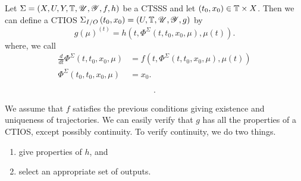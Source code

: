 
Let $\Sigma = \left( X, U, Y, \mathbb{T}, \mathscr{U}, \mathscr{Y}, f, h \right) $ be a CTSSS and let $\left( t_0, x_0 \right) \in \mathbb{T} \times X$. Then we can define a CTIOS $\Sigma _{I / O}\left( t_0, x_0 \right)  =\left( U, \mathbb{T} , \mathscr{U}, \mathscr{Y}, g\right)  $ by 
\[
	g\left( \mu \right) ^{\left( t \right) } = h\left( t, \Phi^{\Sigma}\left( t, t_0, x_0, \mu \right) , \mu\left( t \right)  \right) 
.\] 
where, we call 
\tdomain\begin{align*}
	\frac{d}{dt}\Phi^{\Sigma}\left( t, t_0, x_0, \mu \right) &= f\left( t, \Phi^{\Sigma}\left( t, t_0, x_0, \mu \right) , \mu\left( t \right)  \right)  \\
	\Phi^{\Sigma}\left( t_0, t_0, x_0, \mu \right) &= x_0
.\end{align*}
\begin{note}
	\begin{align*}
	.\end{align*}
\end{note}
We assume that $f$ satisfies the previous conditions giving existence and uniqueness of trajectories. We can easily verify that $g$ has all the properties of a CTIOS, except possibly continuity. To verify continuity, we do two things.
\begin{enumerate}
	\item give properties of $h$, and 
	\item select an appropriate set of outputs.
\end{enumerate}

